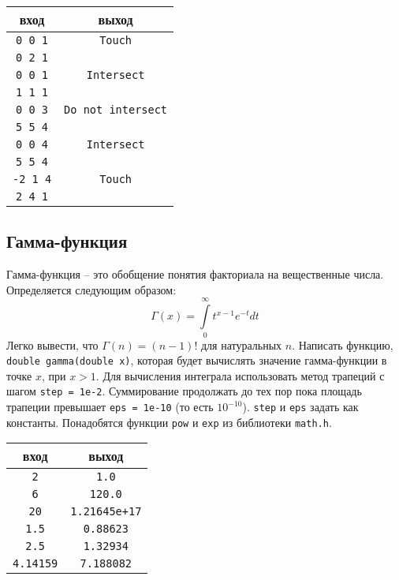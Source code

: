\documentclass{article}
\begin{document}
\begin{center}
\begin{tabular}{ c c }
 вход & выход \\ \hline
 \texttt{0 0 1} & \texttt{Touch}  \\ 
 \texttt{0 2 1} &   \\  \hline
 \texttt{0 0 1} & \texttt{Intersect}  \\ 
 \texttt{1 1 1} &   \\  \hline
 \texttt{0 0 3} & \texttt{Do not intersect}  \\ 
 \texttt{5 5 4} &   \\  \hline
 \texttt{0 0 4} & \texttt{Intersect}  \\ 
 \texttt{5 5 4} &   \\  \hline
 \texttt{-2 1 4} & \texttt{Touch}  \\ 
 \texttt{2 4 1} &   \\
\end{tabular}
\end{center}


\subsection{Гамма-функция} 
Гамма-функция -- это обобщение понятия факториала на вещественные числа. Определяется следующим образом:
$$
\Gamma \left( x \right) = \int\limits_0^\infty {t^{x - 1} e^{ - t} dt}
$$
Легко вывести, что $\Gamma(n) = (n - 1)!$ для натуральных $n$. Написать функцию, \texttt{double gamma(double x)}, которая будет вычислять значение гамма-функции в точке $x$, при $x > 1$. Для вычисления интеграла использовать метод трапеций с шагом \texttt{step = 1e-2}. Суммирование продолжать до тех пор пока площадь трапеции превышает \texttt{eps = 1e-10} (то есть $10 ^{-10}$). \texttt{step} и \texttt{eps} задать как константы. Понадобятся функции \texttt{pow} и \texttt{exp} из библиотеки \texttt{math.h}.

\begin{center}
\begin{tabular}{ c c }
 вход & выход \\ \hline
 \texttt{2} & \texttt{1.0}  \\ 
 \texttt{6} & \texttt{120.0}  \\
 \texttt{20} & \texttt{1.21645e+17}  \\
 \texttt{1.5} &        \texttt{0.88623} \\
 \texttt{2.5} &        \texttt{1.32934}\\
 \texttt{4.14159} & \texttt{7.188082}\\
\end{tabular}
\end{center}
\end{document}
